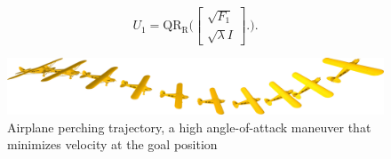 \documentclass{article}
\begin{document}
\begin{equation}
  U_1 =  \operatorname{QR_R}\bigg( 
  \begin{bmatrix} \sqrt{F_1} \\ \sqrt{\lambda} I \end{bmatrix}.
  \bigg).
\end{equation}

\begin{figure}
  \centering
  \includegraphics[width=\textwidth]{perch_cropped.png}
  \caption{Airplane perching trajectory, a high angle-of-attack maneuver that minimizes 
    velocity at the goal position}
  \label{fig:perch}
\end{figure}


\end{document}
